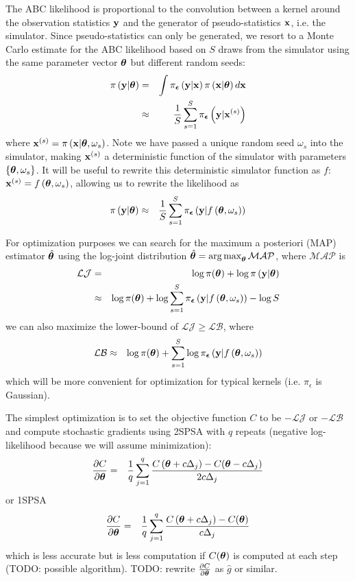 \documentclass[]{article}
\begin{document}
The ABC likelihood is proportional to the convolution between a kernel around the observation statistics ${\bf y}$ and the generator of pseudo-statistics ${\bf x}$, i.e. the simulator.  Since pseudo-statistics can only be generated, we resort to a Monte Carlo estimate for the ABC likelihood based on $S$ draws from the simulator using the same parameter vector ${\bm \theta}$ but different random seeds:
\begin{eqnarray}
  \pi\left( {\bf y} | {\bm \theta} \right) & = &  \int \pi_{{\bm {\epsilon}}}\left( {\bf y} | {\bf x} \right) \pi\left( {\bf x} | {\bm \theta} \right) d {\bf x} \\
   & \approx & \frac{1}{S} \sum_{s=1}^S \pi_{{\bm {\epsilon}}}\left( {\bf y} | {\bf x}^{(s)} \right)
\end{eqnarray}
where ${\bf x}^{(s)} = \pi\left( {\bf x} | {\bm \theta}, \omega_s \right)$.  Note we have passed a unique random seed $\omega_s$ into the simulator, making ${\bf x}^{(s)}$ a deterministic function of the simulator with parameters $\{{\bm \theta}, \omega_s\}$.  It will be useful to rewrite this deterministic simulator function as $f$: ${\bf x}^{(s)} = f\left( {\bm \theta}, \omega_s \right)$, allowing us to rewrite the likelihood as
\begin{eqnarray}
  \pi\left( {\bf y} | {\bm \theta} \right) & \approx & \frac{1}{S} \sum_{s=1}^S \pi_{{\bm {\epsilon}}}\left( {\bf y} | f\left( {\bm \theta}, \omega_s \right) \right)
\end{eqnarray}

For optimization purposes we can search for the maximum a posteriori (MAP) estimator $\hat{{\bm \theta}}$ using the log-joint distribution $\hat{{\bm \theta}} = \operatorname*{arg\,max}_{{\bm \theta}} \mathcal{MAP}$, where $\mathcal{MAP}$ is
\begin{eqnarray}
  \mathcal{LJ} &    =    & \log \pi({\bm \theta}) + \log \pi\left( {\bf y} | {\bm \theta} \right) \\
                & \approx &\log \pi({\bm \theta}) + \log \sum_{s=1}^S \pi_{{\bm {\epsilon}}}\left( {\bf y} | f\left( {\bm \theta}, \omega_s \right) \right) - \log S
\end{eqnarray} 
we can also maximize the lower-bound of $\mathcal{LJ} \geq \mathcal{LB}$, where 
\begin{eqnarray}
  \mathcal{LB} & \approx &\log \pi({\bm \theta}) + \sum_{s=1}^S \log  \pi_{{\bm {\epsilon}}}\left( {\bf y} | f\left( {\bm \theta}, \omega_s \right) \right)
\end{eqnarray} 
which will be more convenient for optimization for typical kernels (i.e. $\pi_{\epsilon}$ is Gaussian).

The simplest optimization is to set the objective function  $C$ to be $-\mathcal{LJ}$ or $-\mathcal{LB}$ and compute stochastic gradients using 2SPSA with $q$ repeats (negative log-likelihood because we will assume minimization):
\begin{eqnarray}
  \frac{\partial C}{\partial {\bm \theta}} & = & \frac{1}{q} \sum_{j=1}^{q} \frac{C\left( {\bm \theta} + c \Delta_j\right) - C{\left({\bm \theta} - c \Delta_j\right)}}{2 c \Delta_j}
\end{eqnarray}
or 1SPSA
\begin{eqnarray}
  \frac{\partial C}{\partial {\bm \theta}} & = & \frac{1}{q} \sum_{j=1}^{q}  \frac{C\left( {\bm \theta} + c \Delta_j\right) - C({\bm \theta})}{c \Delta_j}
\end{eqnarray}
which is less accurate but is less computation if $C({\bm \theta})$ is computed at each step (TODO: possible algorithm).  TODO: rewrite $\frac{\partial C}{\partial {\bm \theta}}$ as $\hat{g}$ or similar.
\end{document}
